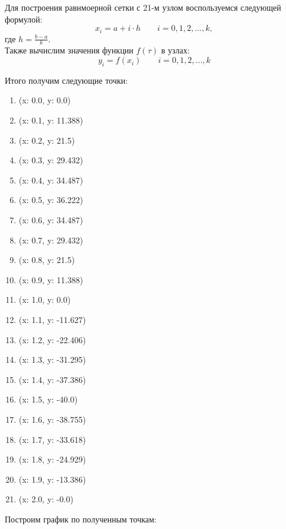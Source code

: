 \documentclass[a4paper, 14pt]{extarticle}
\begin{document}
Для построения равнмоерной сетки с 21-м узлом воспользуемся следующей формулой:
\begin{equation*}
  x_i = a + i \cdot h \qquad i=0,1,2,...,k,
\end{equation*}
где $h = \frac{b - a}{k}$.\\

Также вычислим значения функции $f(\tau)$ в узлах:
\begin{equation*}
  y_i = f(x_i) \qquad i=0,1,2,...,k
\end{equation*}

Итого получим следующие точки:

\begin{multicols}{3}
    \begin{enumerate}[itemsep=5pt]
        \item (x: 0.0, y: 0.0)
        \item (x: 0.1, y: 11.388)
        \item (x: 0.2, y: 21.5)
        \item (x: 0.3, y: 29.432)
        \item (x: 0.4, y: 34.487)
        \item (x: 0.5, y: 36.222)
        \item (x: 0.6, y: 34.487)
        \item (x: 0.7, y: 29.432)
        \item (x: 0.8, y: 21.5)
        \item (x: 0.9, y: 11.388)
        \item (x: 1.0, y: 0.0)
        \item (x: 1.1, y: -11.627)
        \item (x: 1.2, y: -22.406)
        \item (x: 1.3, y: -31.295)
        \item (x: 1.4, y: -37.386)
        \item (x: 1.5, y: -40.0)
        \item (x: 1.6, y: -38.755)
        \item (x: 1.7, y: -33.618)
        \item (x: 1.8, y: -24.929)
        \item (x: 1.9, y: -13.386)
        \item (x: 2.0, y: -0.0)
    \end{enumerate} 
\end{multicols}

Построим график по полученным точкам:
\end{document}
